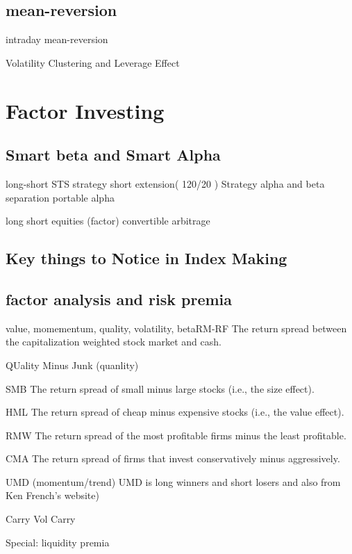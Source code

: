 \documentclass[11pt, openany]{book}              %
\begin{document}
\section{mean-reversion}

intraday mean-reversion





Volatility Clustering and Leverage Effect 

\chapter{Factor Investing}
 
\section{Smart beta and Smart Alpha}                  %

long-short STS strategy
short extension( 120/20 ) Strategy
alpha and beta separation
portable alpha 

long short equities (factor) 
convertible arbitrage


\section{Key things to Notice in Index Making}
\section{factor analysis and risk premia}

value, momementum, quality, volatility, betaRM-RF  The return spread between the capitalization weighted stock market and cash.

QUality Minus Junk (quanlity)

SMB      The return spread of small minus large stocks (i.e., the size effect).

HML      The return spread of cheap minus expensive stocks (i.e., the value effect).

RMW     The return spread of the most profitable firms minus the least profitable.

CMA      The return spread of firms that invest conservatively minus aggressively.

UMD (momentum/trend) UMD is long winners and short losers and also from Ken French’s website)

Carry  Vol Carry


Special: liquidity premia 
\end{document}
